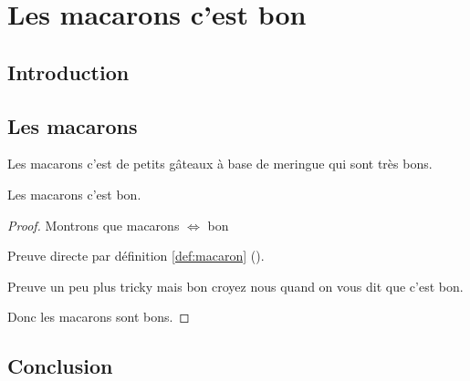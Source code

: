
\chapter{Les macarons c'est bon}



\section{Introduction}

\section{Les macarons}
\begin{definition}[Macaron]
  Les macarons c'est de petits gâteaux à base de meringue qui sont très bons.
  \label{def:macaron}
\end{definition}

\begin{proposition}
  Les macarons c'est bon.
\end{proposition}

\begin{proof}
  Montrons que macarons $\Leftrightarrow$ bon
  
  \begin{myproof}
    Preuve directe par définition \ref{def:macaron} ().
  \end{myproof}
  \begin{myproof}
    Preuve un peu plus tricky mais bon croyez nous quand on vous dit que c'est bon.
  \end{myproof}
  Donc les macarons sont bons.
\end{proof}

\section{Conclusion}
